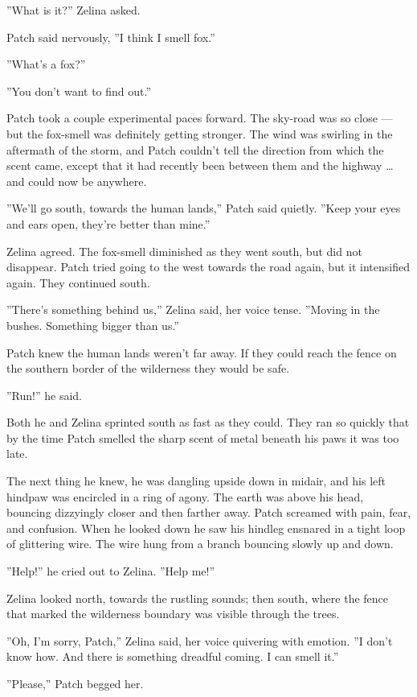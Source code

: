 \documentclass[12pt]{book}
\begin{document}
''What is it?'' Zelina asked.

Patch said nervously, ''I think I smell fox.''

''What's a fox?''

''You don't want to find out.''

Patch took a couple experimental paces forward. The sky-road was so close ---
but the fox-smell was definitely getting stronger. The wind was swirling in the aftermath of the storm, and Patch couldn't tell the direction from which the scent came, except that it had recently been between them and the highway \ldots{}
and could now be anywhere.

''We'll go south, towards the human lands,'' Patch said quietly. ''Keep your eyes and ears open, they're better than mine.''

Zelina agreed. The fox-smell diminished as they went south, but did not disappear. Patch tried going to the west towards the road again, but it intensified again. They continued south.

''There's something behind us,'' Zelina said, her voice tense. ''Moving in the bushes. Something bigger than us.''

Patch knew the human lands weren't far away. If they could reach the fence on the southern border of the wilderness they would be safe.

''Run!'' he said.

Both he and Zelina sprinted south as fast as they could. They ran so quickly that by the time Patch smelled the sharp scent of metal beneath his paws it was too late.

The next thing he knew, he was dangling upside down in midair, and his left hindpaw was encircled in a ring of agony. The earth was above his head, bouncing dizzyingly closer and then farther away. Patch screamed with pain, fear, and confusion. When he looked down he saw his hindleg ensnared in a tight loop of glittering wire. The wire hung from a branch bouncing slowly up and down.

''Help!'' he cried out to Zelina. ''Help me!''

Zelina looked north, towards the rustling sounds; then south, where the fence that marked the wilderness boundary was visible through the trees.

''Oh, I'm sorry, Patch,'' Zelina said, her voice quivering with emotion. ''I don't know how. And there is something dreadful coming. I can smell it.''

''Please,'' Patch begged her.
\end{document}
